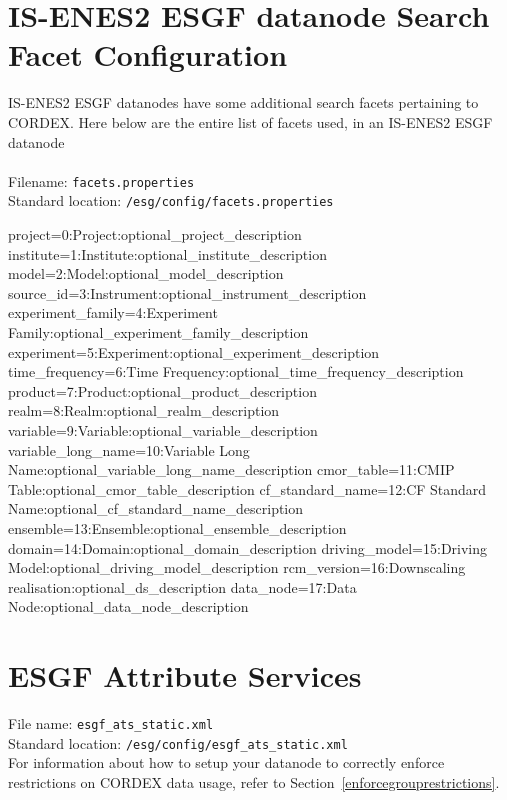 \section{IS-ENES2 ESGF datanode Search Facet Configuration}
IS-ENES2 ESGF datanodes have some additional search facets pertaining to CORDEX. Here below are the entire list of facets used, in an IS-ENES2 ESGF datanode\\
\vspace{1mm}\\
Filename: \texttt{facets.properties}\\
Standard location: \texttt{/esg/config/facets.properties}
\begin{small}
\begin{verbatimtab}[4]
project=0:Project:optional_project_description
institute=1:Institute:optional_institute_description
model=2:Model:optional_model_description
source_id=3:Instrument:optional_instrument_description
experiment_family=4:Experiment Family:optional_experiment_family_description
experiment=5:Experiment:optional_experiment_description
time_frequency=6:Time Frequency:optional_time_frequency_description
product=7:Product:optional_product_description
realm=8:Realm:optional_realm_description
variable=9:Variable:optional_variable_description
variable_long_name=10:Variable Long Name:optional_variable_long_name_description
cmor_table=11:CMIP Table:optional_cmor_table_description
cf_standard_name=12:CF Standard Name:optional_cf_standard_name_description
ensemble=13:Ensemble:optional_ensemble_description
domain=14:Domain:optional_domain_description
driving_model=15:Driving Model:optional_driving_model_description
rcm_version=16:Downscaling realisation:optional_ds_description
data_node=17:Data Node:optional_data_node_description
\end{verbatimtab}
\end{small}
\section{ESGF Attribute Services}
\label{attribservicesfile}
File name: \texttt{esgf\_ats\_static.xml}\\
Standard location: \texttt{/esg/config/esgf\_ats\_static.xml}\\
For information about how to setup your datanode to correctly enforce restrictions on CORDEX data usage, refer to Section~\ref{enforcegrouprestrictions}.

